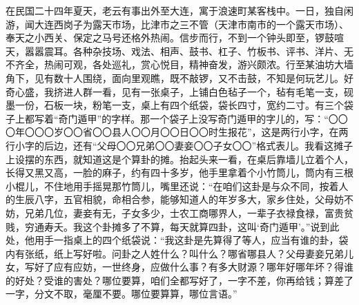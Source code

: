 \documentclass[12pt,UTF8]{ctexbook}
\begin{document}
在民国二十四年夏天，老云有事出外至大连，寓于浪速町某客栈中。一日，独自闲游，闻大连西岗子为露天市场，比津市之三不管（天津市南市的一个露天市场）、奉天之小西关、保定之马号还格外热闹。信步而行，不到一个钟头即至，锣鼓喧天，嚣嚣震耳。各种杂技场、戏法、相声、鼓书、杠子、竹板书、评书、洋片、无不齐全，热闹可观，各处巡礼，赏心悦目，精神奋发，游兴颇浓。行至某油坊大墙角下，见有数十人围绕，面向里观瞧，既不敲锣，又不击鼓，不知是何玩艺儿。好奇心盛，我挤进人群一看，见有一张桌子，上铺白色毡子一个，毡有毛笔一支，砚墨一份，石板一块，粉笔一支，桌上有四个纸袋，袋长四寸，宽约二寸。有三个袋子上都写着“奇门遁甲”的字样。那一个袋子上没写奇门遁甲的字儿的，写：“〇〇〇年〇〇〇岁〇〇省〇〇县人〇〇月〇〇日〇〇时生报花”，这是两行小字，在两行小字的后边，还有“父母〇〇兄弟〇〇妻妾〇〇子女〇〇”格式表儿。我看这摊子上设摆的东西，就知道这是个算卦的摊。抬起头来一看，在桌后靠墙儿立着个人，长得又黑又高，一脸的麻子，约有四十多岁，他手里拿着个小竹筒儿，筒内有三根小棍儿，不住地用手摇晃那竹筒儿，嘴里还说：“在咱们这卦是与众不同，按着人的生辰八字，五官相貌，命相合参，能够知道人的年岁多大，家乡住处，父母妨不妨，兄弟几位，妻妾有无，子女多少，士农工商哪界人，一辈子衣禄食禄，富贵贫贱，穷通寿夭。我这个卦摊多了不算，每天就算四卦，这叫‘奇门遁甲’。”说到此处，他用手一指桌上的四个纸袋说：“我这卦是先算得了等人，应当有谁的卦，袋内有张纸，纸上写好啦。问卦之人姓什么？叫什么？哪省哪县人？父母妻妾兄弟儿女，写好了应有应妨，一世终身，应做什么事？有多大财源？哪年好哪年坏？得谁的好处？受谁的害处？哪位要算，咱们全都写好了，一字不差，你再给钱；算差了一字，分文不取，毫厘不要。哪位要算算，哪位言语。”
\end{document}
